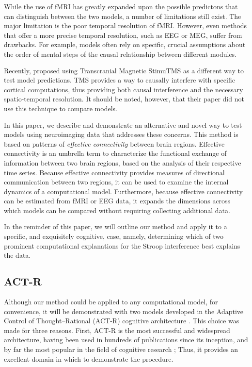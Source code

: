 \documentclass[10pt,letterpaper]{article}
\begin{document}
While the use of fMRI has greatly expanded upon the possible predictons that can distinguish between the two models, a number of limitations still exist. The major limitation is the poor temporal resolution of fMRI.  However, even methods that offer a more precise temporal resolution, such as EEG or MEG, suffer from drawbacks. For example, models often rely on specific, crucial assumptions about the order of mental steps of the causal relationship between different modules. 

Recently,  proposed using Transcranial Magnetic StimuTMS as a different way to test model predictions. TMS provides a way to causally interfere with specific cortical computations, thus providing both causal interference and the necessary spatio-temporal resolution. It should be noted, however, that their paper did not use this technique to compare models. 

In this paper, we describe and demonstrate an alternative and novel way to test models using neuroimaging data that addresses these concerns. This method is based on patterns of {\it effective connectivity} between brain regions. Effective connectivity is an umbrella term to characterize the functional exchange of information between two brain regions, based on the analysis of their respective time series. Because effective connectivity provides measures of directional communication between two regions, it can be used to examine the internal dynamics of a computational model.  Furthermore, because effective connectivity can be estimated from fMRI or EEG data, it expands the dimensions across which models can be compared without requiring collecting additional data.

In the reminder of this paper, we will outline our method and apply it to a specific, and exquisitely cognitive, case, namely, determining which of two prominent computational explanations for the Stroop interference best explains the data.    

\subsection{ACT-R}

Although our method could be applied to any computational model, for convenience, it will be demonstrated with two models developed in the Adaptive Control of Thought--Rational (ACT-R) cognitive architecture \cite{Anderson2004}. This choice was made for three reasons.  First, ACT-R is the most successful and widespread architecture, having been used in hundreds of publications since its inception, and by far the most popular in the field of cognitive research \cite{Kotseruba2018}; Thus, it provides an excellent domain in which to demonstrate the procedure.
\end{document}
